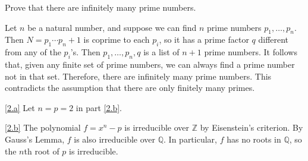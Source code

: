 \documentclass{homework}
\begin{document}
\maketitle

\begin{problem}[Euclid]
Prove that there are infinitely many prime numbers.
\end{problem}

\begin{solution}
Let $n$ be a natural number, and suppose we can find $n$ prime numbers
$p_1, \ldots, p_n$.
Then $N = p_1 \cdots p_n + 1$ is coprime to each $p_i$, so it has a prime factor
$q$ different from any of the $p_i$'s.
Then $p_1,\ldots,p_n,q$ is a list of $n+1$ prime numbers.
It follows that, given any finite set of prime numbers, we can always find a
prime number not in that set.
Therefore, there are infinitely many prime numbers.
This contradicts the assumption that there are only finitely many primes.
\end{solution}

\begin{problem}
\end{problem}

\begin{solution}
\ref{2.a}
Let $n = p = 2$ in part \ref{2.b}.

\ref{2.b}
The polynomial $f = x^n - p$ is irreducible over $\mathbb{Z}$ by Eisenstein's
criterion.
By Gauss's Lemma, $f$ is also irreducible over $\mathbb{Q}$.
In particular, $f$ has no roots in $\mathbb Q$, so the $n$th root of $p$ is
irreducible.
\end{solution}
\end{document}
